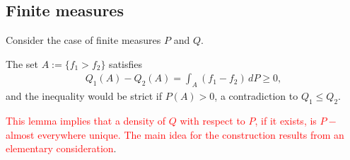 \documentclass{report}
\begin{document}
\subsection{Finite measures}
Consider the case of finite measures $P$ and $Q$. 
\begin{myproof}
    The set $A:=\{f_1>f_2\}$ satisfies
    \begin{align*}
        Q_1(A)-Q_2(A)=\int_A(f_1-f_2)\,dP\geq 0,
    \end{align*}and the inequality would be strict if $P(A)>0$, a contradiction to $Q_1\leq Q_2$.
\end{myproof}
\textcolor{red}{This lemma implies that a density of $Q$ with respect to $P$, if it exists, is $P-$almost everywhere unique.}
\textcolor{red}{The main idea for the construction results from an elementary consideration}.\\
\end{document}
